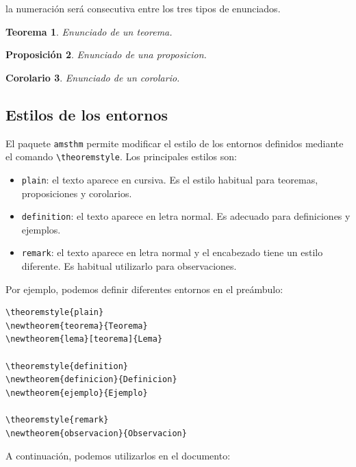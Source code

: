 \documentclass[11pt,a4paper]{article}
\theoremstyle{plain}
\newtheorem{teorema}{Teorema}
\newtheorem{proposicion}[teorema]{Proposición}
\newtheorem{corolario}[teorema]{Corolario}
\theoremstyle{definition}
\theoremstyle{remark}
\theoremstyle{exercise}
\begin{document}
\noindent la numeración será consecutiva entre los tres tipos de enunciados.

\begin{paginarecuadrada}
\begin{teorema}
    Enunciado de un teorema.
\end{teorema}

\begin{proposicion}
    Enunciado de una proposicion.
\end{proposicion}

\begin{corolario}
    Enunciado de un corolario.
\end{corolario}
\end{paginarecuadrada}


\subsection{Estilos de los entornos}

El paquete \verb|amsthm| permite modificar el estilo de los entornos definidos mediante el comando \verb|\theoremstyle|. Los principales estilos son:

\begin{itemize}
    \item \verb|plain|: el texto aparece en cursiva. Es el estilo habitual para teoremas, proposiciones y corolarios.
    \item \verb|definition|: el texto aparece en letra normal. Es adecuado para definiciones y ejemplos.
    \item \verb|remark|: el texto aparece en letra normal y el encabezado tiene un estilo diferente. Es habitual utilizarlo para observaciones.
\end{itemize}

\noindent Por ejemplo, podemos definir diferentes entornos en el preámbulo:

\begin{lstlisting}
\theoremstyle{plain}
\newtheorem{teorema}{Teorema}
\newtheorem{lema}[teorema]{Lema}

\theoremstyle{definition}
\newtheorem{definicion}{Definicion}
\newtheorem{ejemplo}{Ejemplo}

\theoremstyle{remark}
\newtheorem{observacion}{Observacion}
\end{lstlisting}

\medskip

\noindent A continuación, podemos utilizarlos en
el documento:
\end{document}
